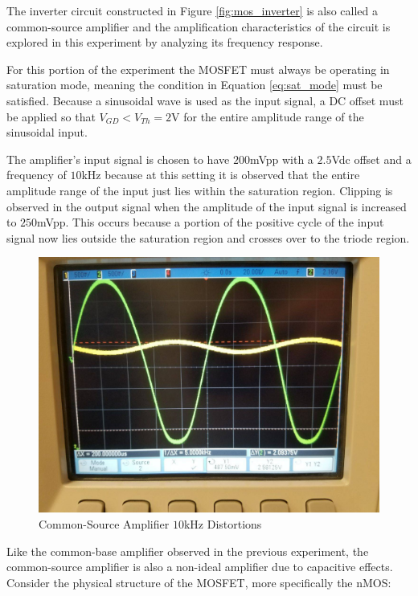 The inverter circuit constructed in Figure \ref{fig:mos_inverter} is also called a common-source amplifier and the amplification characteristics of the circuit is explored in this experiment by analyzing its frequency response.

For this portion of the experiment the MOSFET must always be operating in saturation mode, meaning the condition in Equation \ref{eq:sat_mode} must be satisfied. Because a sinusoidal wave is used as the input signal, a DC offset must be applied so that $V_{GD} < V_{Th} = 2$\si{\volt} for the entire amplitude range of the sinusoidal input. 

The amplifier's input signal is chosen to have $200$\si{\milli\volt}pp with a $2.5$\si{\volt}dc offset and a frequency of $10$\si{\kilo\hertz} because at this setting it is observed that the entire amplitude range of the input just lies within the saturation region. Clipping is observed in the output signal when the amplitude of the input signal is increased to $250$\si{\milli\volt}pp. This occurs because a portion of the positive cycle of the input signal now lies outside the saturation region and crosses over to the triode region. 

\FloatBarrier
\begin{figure}[h!]
	\centering
	\includegraphics[scale=0.25]{../images/amplifier_clamping.jpeg}
	\caption{Common-Source Amplifier $10$\si{\kilo\hertz} Distortions}
	\label{fig:amplifier_clipping}
\end{figure}
\FloatBarrier

Like the common-base amplifier observed in the previous experiment, the common-source amplifier is also a non-ideal amplifier due to capacitive effects. Consider the physical structure of the MOSFET, more specifically the nMOS:

